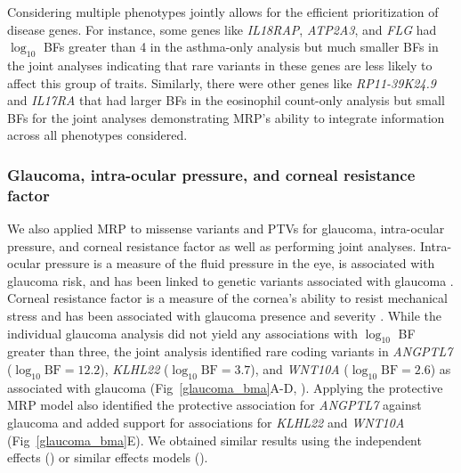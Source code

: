Considering multiple phenotypes jointly allows for the efficient prioritization of disease genes. For instance, some genes like \textit{IL18RAP}, \textit{ATP2A3}, and \textit{FLG} had $\log_{10}$ BFs greater than 4 in the asthma-only analysis but much smaller BFs in the joint analyses indicating that rare variants in these genes are less likely to affect this group of traits. Similarly, there were other genes like \textit{RP11-39K24.9} and \textit{IL17RA} that had larger BFs in the eosinophil count-only analysis but small BFs for the joint analyses demonstrating MRP's ability to integrate information across all phenotypes considered.

\subsubsection*{Glaucoma, intra-ocular pressure, and corneal resistance factor}
We also applied MRP to missense variants and PTVs for glaucoma, intra-ocular pressure, and corneal resistance factor as well as performing joint analyses. Intra-ocular pressure is a measure of the fluid pressure in the eye, is associated with glaucoma risk, and has been linked to genetic variants associated with glaucoma \cite{doi:10.1001/jama.2014.3192}. Corneal resistance factor is a measure of the cornea's ability to resist mechanical stress and has been associated with glaucoma presence and severity \cite{CXO:CXO414, MANSOURI2012419, GriseDulac:2012bo}. While the individual glaucoma analysis did not yield any associations with $\log_{10}$ BF greater than three, the joint analysis identified rare coding variants in \textit{ANGPTL7} ($\log_{10} \textrm{BF} = 12.2$), \textit{KLHL22} ($\log_{10} \textrm{BF} = 3.7$), and \textit{WNT10A} ($\log_{10} \textrm{BF} = 2.6$) as associated with glaucoma (Fig~\ref{glaucoma_bma}A-D, ). Applying the protective MRP model also identified the protective association for \textit{ANGPTL7} against glaucoma and added support for associations for \textit{KLHL22} and \textit{WNT10A} (Fig~\ref{glaucoma_bma}E). We obtained similar results using the independent effects () or similar effects models (). 


